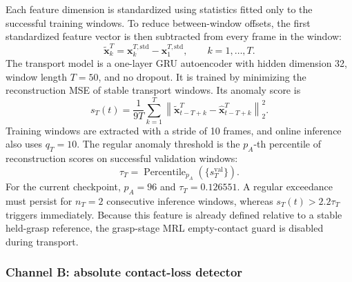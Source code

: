 Each feature dimension is standardized using statistics fitted only to the
successful training windows. To reduce between-window offsets, the first
standardized feature vector is then subtracted from every frame in the
window:
%
\begin{equation}
    \tilde{\mathbf{x}}^{T}_k
    =
    \mathbf{x}^{T,\mathrm{std}}_k
    -
    \mathbf{x}^{T,\mathrm{std}}_1,
    \qquad k=1,\ldots,T.
    \label{eq:first_frame_relative}
\end{equation}
%
The transport model is a one-layer GRU autoencoder with hidden dimension 32,
window length $T=50$, and no dropout. It is trained by minimizing the
reconstruction MSE of stable transport windows. Its anomaly score is
%
\begin{equation}
    s_T(t)
    =
    \frac{1}{9T}
    \sum_{k=1}^{T}
    \left\|
    \tilde{\mathbf{x}}^{T}_{t-T+k}
    -
    \hat{\mathbf{x}}^{T}_{t-T+k}
    \right\|_2^2 .
    \label{eq:transport_score}
\end{equation}
%
Training windows are extracted with a stride of 10 frames, and online
inference also uses $q_T=10$. The regular anomaly threshold is the
$p_A$-th percentile of reconstruction scores on successful validation
windows:
%
\begin{equation}
    \tau_T
    =
    \operatorname{Percentile}_{p_A}
    \left(\{s_T^{\mathrm{val}}\}\right).
    \label{eq:transport_threshold}
\end{equation}
%
For the current checkpoint, $p_A=96$ and $\tau_T=0.126551$. A regular
exceedance must persist for $n_T=2$ consecutive inference windows, whereas
$s_T(t)>2.2\tau_T$ triggers immediately. Because this feature is already
defined relative to a stable held-grasp reference, the grasp-stage MRL
empty-contact guard is disabled during transport.

\subsubsection{Channel B: absolute contact-loss detector}
\label{sec:transport_channel_b}

